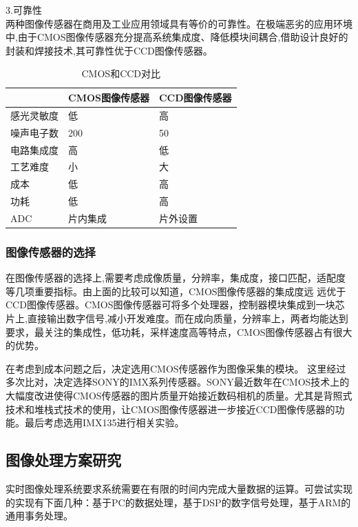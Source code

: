 3.可靠性\\

两种图像传感器在商用及工业应用领域具有等价的可靠性。在极端恶劣的应用环境中,由于CMOS图像传感器充分提高系统集成度、降低模块间耦合,借助设计良好的封装和焊接技术,其可靠性优于CCD图像传感器。

\begin{table}[htbp]
	\caption{\label{tab:cmosccd}CMOS和CCD对比}
	\centering
 \begin{tabular}{|L{2.2cm}|C{4cm}|R{4cm}|}
\hline
	& CMOS图像传感器 & CCD图像传感器 \\ \hline
	 \hline
	感光灵敏度 & 低 & 高 \\ \hline
	噪声电子数 & 200 & 50 \\ \hline
	电路集成度 & 高 & 低 \\ \hline
	工艺难度 & 小 & 大 \\ \hline
	成本 & 低 & 高 \\ \hline
	功耗 & 低 & 高 \\  \hline
	ADC  & 片内集成  &  片外设置 \\ \hline
 \end{tabular} 
\end{table}

\subsubsection{图像传感器的选择}
在图像传感器的选择上,需要考虑成像质量，分辨率，集成度，接口匹配，适配度等几项重要指标。由上面的比较可以知道，CMOS图像传感器的集成度远
远优于CCD图像传感器。CMOS图像传感器可将多个处理器，控制器模块集成到一块芯片上,直接输出数字信号,减小开发难度。而在成向质量，分辨率上，两者均能达到要求，最关注的集成性，低功耗，采样速度高等特点，CMOS图像传感器占有很大的优势。

在考虑到成本问题之后，决定选用CMOS传感器作为图像采集的模块。
这里经过多次比对，决定选择SONY的IMX系列传感器。SONY最近数年在CMOS技术上的大幅度改进使得CMOS传感器的图片质量开始接近数码相机的质量。尤其是背照式技术和堆栈式技术的使用，让CMOS图像传感器进一步接近CCD图像传感器的功能。最后考虑选用IMX135进行相关实验。


\subsection{图像处理方案研究}
实时图像处理系统要求系统需要在有限的时间内完成大量数据的运算。可尝试实现的实现有下面几种：基于PC的数据处理，基于DSP的数字信号处理，基于ARM的通用事务处理。

